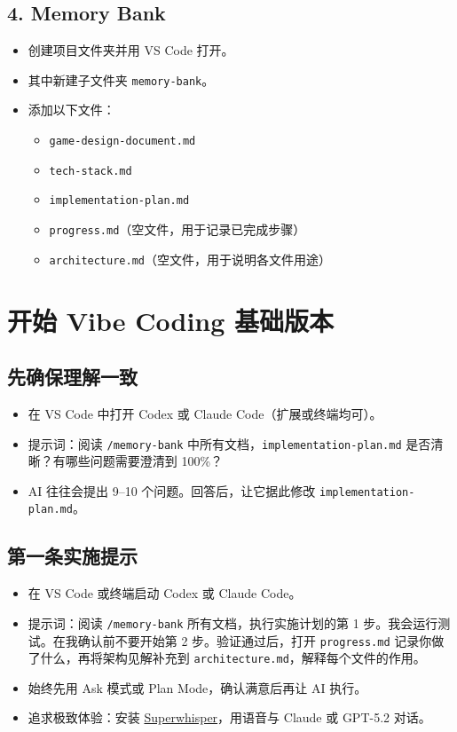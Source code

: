\documentclass[12pt]{article}
\begin{document}
\subsection{4. Memory Bank}
\begin{itemize}
  \item 创建项目文件夹并用 VS Code 打开。
  \item 其中新建子文件夹 \texttt{memory-bank}。
  \item 添加以下文件：
  \begin{itemize}
    \item \texttt{game-design-document.md}
    \item \texttt{tech-stack.md}
    \item \texttt{implementation-plan.md}
    \item \texttt{progress.md}（空文件，用于记录已完成步骤）
    \item \texttt{architecture.md}（空文件，用于说明各文件用途）
  \end{itemize}
\end{itemize}

\section{开始 Vibe Coding 基础版本}
\subsection{先确保理解一致}
\begin{itemize}
  \item 在 VS Code 中打开 Codex 或 Claude Code（扩展或终端均可）。
  \item 提示词：阅读 \texttt{/memory-bank} 中所有文档，\texttt{implementation-plan.md} 是否清晰？有哪些问题需要澄清到 100\%？
  \item AI 往往会提出 9--10 个问题。回答后，让它据此修改 \texttt{implementation-plan.md}。
\end{itemize}

\subsection{第一条实施提示}
\begin{itemize}
  \item 在 VS Code 或终端启动 Codex 或 Claude Code。
  \item 提示词：阅读 \texttt{/memory-bank} 所有文档，执行实施计划的第 1 步。我会运行测试。在我确认前不要开始第 2 步。验证通过后，打开 \texttt{progress.md} 记录你做了什么，再将架构见解补充到 \texttt{architecture.md}，解释每个文件的作用。
  \item 始终先用 Ask 模式或 Plan Mode，确认满意后再让 AI 执行。
  \item 追求极致体验：安装 \href{https://superwhisper.com}{Superwhisper}，用语音与 Claude 或 GPT-5.2 对话。
\end{itemize}
\end{document}
